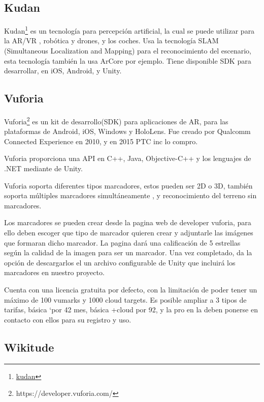 \subsection{Kudan} Kudan\footnote{\href{https://www.xlsoft.com/en/products/kudan/?utm_source=google&utm_medium=adwords&utm_campaign=cp01&gclid=Cj0KCQiAvJXxBRCeARIsAMSkAprma7nGzsXVWd9w5H4HSQzNoOkF2eJu8LzAtEXbaDALYPUdfBOOgpEaAoqoEALw_wcB}{kudan}} es un tecnología para percepción artificial, la cual se puede utilizar para la AR/VR , robótica y drones, y los coches.
Usa la tecnología SLAM (Simultaneous Localization and Mapping) para el reconocimiento del escenario, esta tecnología también la usa ArCore por ejemplo.
Tiene disponible SDK para desarrollar, en iOS, Android, y Unity.

\subsection{Vuforia}
Vuforia\footnote{https://developer.vuforia.com/} es un kit de desarrollo(SDK) para aplicaciones de AR, para las plataformas de Android, iOS, Windows y HoloLens. Fue creado por Qualcomm Connected Experience en 2010, y en 2015 PTC inc lo compro.\cite{simonetti2013vuforia}

Vuforia proporciona una API en C++, Java, Objective-C++ y los lenguajes de .NET mediante de Unity.

Vuforia soporta diferentes tipos marcadores, estos pueden ser 2D o 3D, también soporta múltiples marcadores simultáneamente , y reconocimiento del terreno sin marcadores.

Los marcadores se pueden crear desde la pagina web de developer vuforia, para ello deben escoger que tipo de marcador quieren crear y adjuntarle las imágenes que formaran dicho marcador. La pagina dará una calificación de 5 estrellas según la calidad de la imagen para ser un marcador. Una vez completado, da la opción de descargarlos el un archivo configurable de Unity que incluirá los marcadores en nuestro proyecto.



Cuenta con una licencia gratuita por defecto, con la limitación de poder tener un máximo de 100 vumarks y 1000 cloud targets.
Es posible ampliar a 3 tipos de tarifas, básica `por 42 mes, básica +cloud por 92, y la pro en la deben ponerse en contacto con ellos para su registro y uso.


\subsection{Wikitude}


